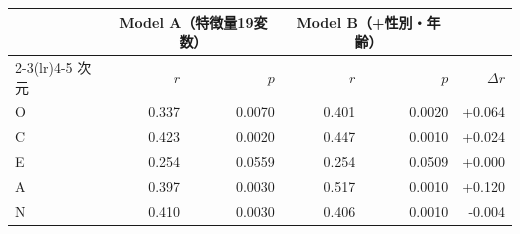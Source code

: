 \begin{tabular}{lrrrrr}
\toprule
 & \multicolumn{2}{c}{Model A（特徴量19変数）} & \multicolumn{2}{c}{Model B（+性別・年齢）} & \\
\cmidrule(lr){2-3}\cmidrule(lr){4-5}
次元 & $r$ & $p$ & $r$ & $p$ & $\Delta r$ \\
\midrule
O & 0.337 & 0.0070 & 0.401 & 0.0020 & +0.064 \\
C & 0.423 & 0.0020 & 0.447 & 0.0010 & +0.024 \\
E & 0.254 & 0.0559 & 0.254 & 0.0509 & +0.000 \\
A & 0.397 & 0.0030 & 0.517 & 0.0010 & +0.120 \\
N & 0.410 & 0.0030 & 0.406 & 0.0010 & -0.004 \\
\bottomrule
\end{tabular}
